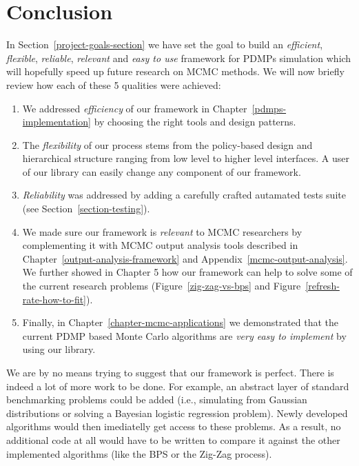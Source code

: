 \documentclass[report.tex]{subfiles}
\begin{document}
\chapter{Conclusion}

In Section~\ref{project-goals-section} we have set the goal to build an
\textit{efficient}, \textit{flexible},
\textit{reliable}, \textit{relevant} and \textit{easy to use}
framework for PDMPs simulation which will hopefully speed up future research
on MCMC methods. We will now briefly review how each of these 5 qualities were
achieved:
\begin{enumerate}
  \item We addressed \textit{efficiency} of our framework in Chapter~\ref{pdmps-implementation}
    by choosing the right tools and design patterns.
  \item The \textit{flexibility} of our process stems from the policy-based design and
    hierarchical structure ranging from low level to higher level interfaces.
    A user of our library can easily change any component of our framework.
  \item \textit{Reliability} was addressed by adding a carefully crafted autamated
    tests suite (see Section~\ref{section-testing}).
  \item We made sure our framework is \textit{relevant} to MCMC researchers
    by complementing it with MCMC
    output analysis tools described in Chapter~\ref{output-analysis-framework} and
    Appendix~\ref{mcmc-output-analysis}.
    We further showed in Chapter 5 how our framework can help to solve some of
    the current research problems (Figure~\ref{zig-zag-vs-bps} and Figure~\ref{refresh-rate-how-to-fit}).
  \item Finally, in Chapter~\ref{chapter-mcmc-applications} we demonstrated that
    the current PDMP based Monte Carlo algorithms are \textit{very easy to implement}
    by using our library.
\end{enumerate}

\noindent
We are by no means trying to suggest that our framework is perfect.
There is indeed a lot of more work to be done.
For example, an abstract layer of standard benchmarking problems could be
added (i.e., simulating from Gaussian distributions or solving a Bayesian
logistic regression problem).
Newly developed algorithms would then imediatelly get access to these
problems.
As a result, no additional code at all would
have to be written to compare it against the other implemented algorithms
(like the BPS or the Zig-Zag process).
\end{document}
